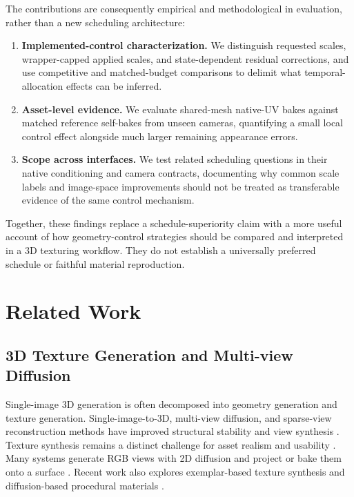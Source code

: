 \documentclass[times,twocolumn,final]{elsarticle}
\begin{document}
The contributions are consequently empirical and methodological in evaluation, rather than a new scheduling architecture:
\begin{enumerate}
\item \textbf{Implemented-control characterization.} We distinguish requested scales, wrapper-capped applied scales, and state-dependent residual corrections, and use competitive and matched-budget comparisons to delimit what temporal-allocation effects can be inferred.
\item \textbf{Asset-level evidence.} We evaluate shared-mesh native-UV bakes against matched reference self-bakes from unseen cameras, quantifying a small local control effect alongside much larger remaining appearance errors.
\item \textbf{Scope across interfaces.} We test related scheduling questions in their native conditioning and camera contracts, documenting why common scale labels and image-space improvements should not be treated as transferable evidence of the same control mechanism.
\end{enumerate}

Together, these findings replace a schedule-superiority claim with a more useful account of how geometry-control strategies should be compared and interpreted in a 3D texturing workflow. They do not establish a universally preferred schedule or faithful material reproduction.


\section{Related Work}
\label{sec:related}

\subsection{3D Texture Generation and Multi-view Diffusion}
\label{subsec:3dtex}

Single-image 3D generation is often decomposed into geometry generation and texture generation. Single-image-to-3D, multi-view diffusion, and sparse-view reconstruction methods have improved structural stability and view synthesis \cite{liu2023zero1to3,shi2023zero123pp,liu2023syncdreamer,long2023wonder3d,shi2024mvdream,wang2023imagedream,xu2024instantmesh,ke2024era3d}. Texture synthesis remains a distinct challenge for asset realism and usability \cite{perla2026survey}. Many systems generate RGB views with 2D diffusion and project or bake them onto a surface \cite{chen2023text2tex,richardson2023texture,poole2023dreamfusion,chen2023fantasia3d}. Recent work also explores exemplar-based texture synthesis and diffusion-based procedural materials \cite{guzman2026adaptive,lv2025interpretable}.
\end{document}
